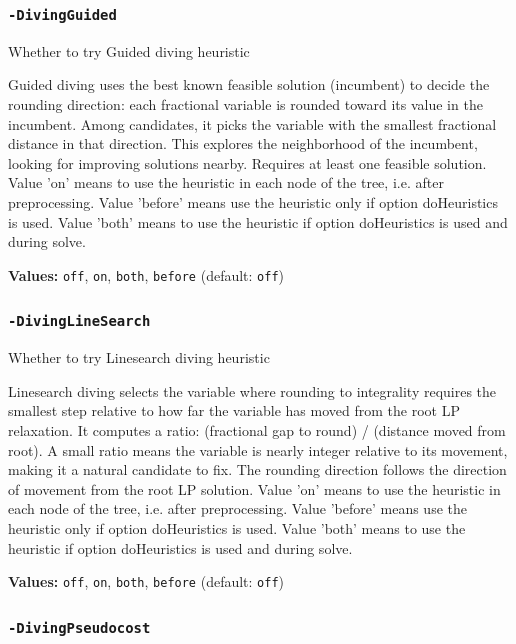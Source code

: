 \documentclass[11pt,a4paper]{article}
\begin{document}
\subsubsection*{\texttt{-DivingGuided}}

Whether to try Guided diving heuristic

Guided diving uses the best known feasible solution (incumbent) to decide the rounding direction: each fractional variable is rounded toward its value in the incumbent. Among candidates, it picks the variable with the smallest fractional distance in that direction. This explores the neighborhood of the incumbent, looking for improving solutions nearby. Requires at least one feasible solution. Value 'on' means to use the heuristic in each node of the tree, i.e. after preprocessing. Value 'before' means use the heuristic only if option doHeuristics is used. Value 'both' means to use the heuristic if option doHeuristics is used and during solve.

\textbf{Values:} \texttt{off}, \texttt{on}, \texttt{both}, \texttt{before} (default: \texttt{off})

\subsubsection*{\texttt{-DivingLineSearch}}

Whether to try Linesearch diving heuristic

Linesearch diving selects the variable where rounding to integrality requires the smallest step relative to how far the variable has moved from the root LP relaxation. It computes a ratio: (fractional gap to round) / (distance moved from root). A small ratio means the variable is nearly integer relative to its movement, making it a natural candidate to fix. The rounding direction follows the direction of movement from the root LP solution. Value 'on' means to use the heuristic in each node of the tree, i.e. after preprocessing. Value 'before' means use the heuristic only if option doHeuristics is used. Value 'both' means to use the heuristic if option doHeuristics is used and during solve.

\textbf{Values:} \texttt{off}, \texttt{on}, \texttt{both}, \texttt{before} (default: \texttt{off})

\subsubsection*{\texttt{-DivingPseudocost}}
\end{document}
